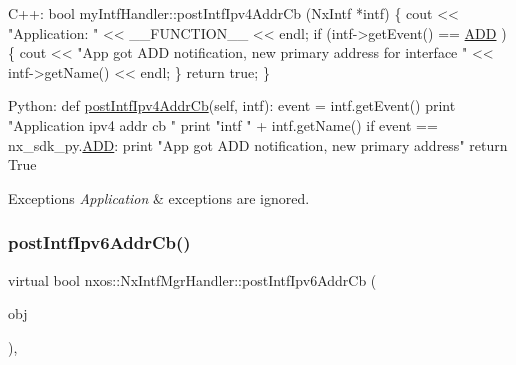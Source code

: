\begin{DoxyCode}
C++:
   \textcolor{keywordtype}{bool}  myIntfHandler::postIntfIpv4AddrCb (NxIntf *intf)
   \{
     cout << \textcolor{stringliteral}{"Application: "} << \_\_FUNCTION\_\_ << endl;
     \textcolor{keywordflow}{if} (intf->getEvent() == \mbox{\hyperlink{namespacenxos_af9a9040b7681199d386e94eb888018cba93d8c810253e44a0fd5f3d8d26032ad5}{ADD}} ) \{
        cout << \textcolor{stringliteral}{"App got ADD notification, new primary address for }
\textcolor{stringliteral}{                  interface  "} <<      intf->getName() << endl;
     \}
     \textcolor{keywordflow}{return} \textcolor{keyword}{true};
   \}

Python:
   def \mbox{\hyperlink{classnxos_1_1_nx_intf_mgr_handler_a8f96e0a3a70f5f566b8f0f5928bf5e64}{postIntfIpv4AddrCb}}(\textcolor{keyword}{self}, intf):
      event = intf.getEvent()
      print \textcolor{stringliteral}{"Application ipv4 addr cb "}
      print \textcolor{stringliteral}{"intf "} + intf.getName()
      if event == nx\_sdk\_py.\mbox{\hyperlink{namespacenxos_af9a9040b7681199d386e94eb888018cba93d8c810253e44a0fd5f3d8d26032ad5}{ADD}}:
         print \textcolor{stringliteral}{"App got ADD notification, new primary address"}
      return True
\end{DoxyCode}



\begin{DoxyExceptions}{Exceptions}
{\em Application} & exceptions are ignored. \\
\hline
\end{DoxyExceptions}
\mbox{\label{classnxos_1_1_nx_intf_mgr_handler_ad845ed26b457bc0bdc7a9c79a94acdaf}} 
\subsubsection{\texorpdfstring{post\+Intf\+Ipv6\+Addr\+Cb()}{postIntfIpv6AddrCb()}}
{\footnotesize\ttfamily virtual bool nxos\+::\+Nx\+Intf\+Mgr\+Handler\+::post\+Intf\+Ipv6\+Addr\+Cb (\begin{DoxyParamCaption}\item[{\mbox{\hyperlink{classnxos_1_1_nx_intf}{Nx\+Intf}} $\ast$}]{obj }\end{DoxyParamCaption})\hspace{0.3cm}{\ttfamily [inline]}, {\ttfamily [virtual]}}

